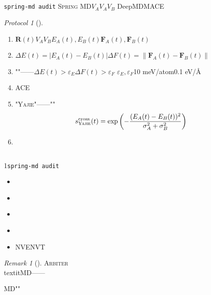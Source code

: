 \documentclass[12pt,a4paper]{article}
\theoremstyle{remark}
\newtheorem{remark}[theorem]{Remark}
\newtheorem{protocol}[theorem]{Protocol}
\newcommand{\Yajie}{\textsc{Yajie}}
\newcommand{\Arbiter}{\textsc{Arbiter}}
\newcommand{\SpringMD}{\textsc{Spring MD}}
\begin{document}
\subsection{}

\texttt{spring-md audit}
\SpringMD{}$V_A$$V_A$$V_B$
DeepMDMACE

\begin{protocol}[]\label{prot:cross_audit}
\begin{enumerate}[label= \arabic*,leftmargin=*,itemsep=3pt]
    \item $\mathbf{R}(t)$$V_A$$V_B$$E_A(t), E_B(t)$$\mathbf{F}_A(t), \mathbf{F}_B(t)$

    \item $\Delta E(t) = |E_A(t) - E_B(t)|$$\Delta F(t) = \|\mathbf{F}_A(t) - \mathbf{F}_B(t)\|$

    \item ""——$\Delta E(t) > \varepsilon_E$$\Delta F(t) > \varepsilon_F$
    $\varepsilon_E, \varepsilon_F$10 meV/atom0.1 eV/Å

    \item ACE

    \item "\Yajie{}"——""
    \begin{equation}
        s_{\Yajie}^{\text{cross}}(t) = \exp\left(-\frac{(E_A(t) - E_B(t))^2}
        {\sigma_A^2 + \sigma_B^2}\right)
    \end{equation}

    \item 
\end{enumerate}
\end{protocol}

\subsection{}

1\texttt{spring-md audit}

\begin{itemize}[itemsep=3pt]
    \item \textbf{} 
    \item \textbf{} 
    \item \textbf{} 
    
    \item \textbf{} 
    \item \textbf{} NVENVT
\end{itemize}

\begin{remark}[]
\Arbiter{}
\\textit{}MD——

MD""
\end{remark}
\end{document}

